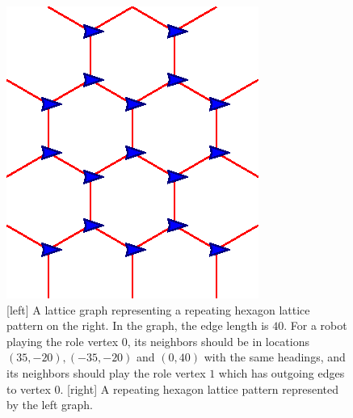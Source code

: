 \begin{figure}
    \centering
    \begin{minipage}[b]{0.45\linewidth}
        \centering
        
    \end{minipage}
    \begin{minipage}[b]{0.45\linewidth}
        \centering
        \includegraphics[scale=0.85]{figs/hex-lat}
    \end{minipage}
    \caption{[left] A lattice graph representing a repeating hexagon lattice pattern on the right. In the graph, the edge length is $40$. For a robot playing the role vertex $0$, its neighbors should be in locations $(35, -20), (-35, -20)$ and $(0, 40)$ with the same headings, and its neighbors should play the role vertex $1$ which has outgoing edges to vertex $0$. [right] A repeating hexagon lattice pattern represented by the left graph.}
    \label{fig:hex}
\end{figure}
